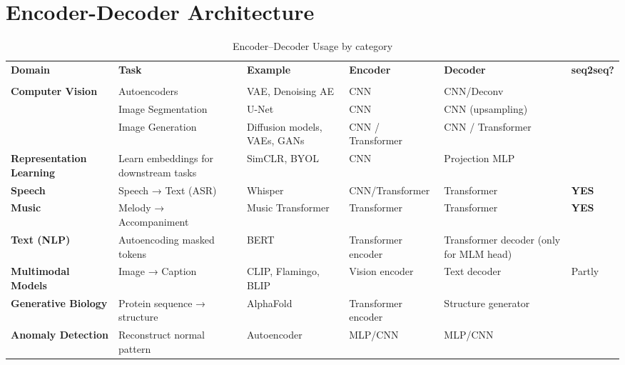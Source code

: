 \chapter{Encoder-Decoder Architecture}

\begin{customArrayStretch}{1.5}
\begin{longtable}{p{2.5cm} p{3cm} p{2.7cm} p{2.7cm} p{2.7cm} l}

\hhline{=:=:=:=:=:=}
\textbf{Domain} & \textbf{Task} & \textbf{Example} & \textbf{Encoder} & \textbf{Decoder} & \textbf{seq2seq?} \\ 
\hhline{=:=:=:=:=:=} \endfirsthead



\hhline{=:=:=:=:=:=} 
\caption{Encoder–Decoder Usage by category \cite{common/online/chatgpt}} \\
\endlastfoot


\textbf{Computer Vision} & Autoencoders & VAE, Denoising AE & CNN & CNN/Deconv &  \\ 
\cline{2-6}

    & Image Segmentation & U-Net & CNN & CNN (upsampling) &  \\ 
\cline{2-6}

    & Image Generation & Diffusion models, VAEs, GANs & CNN / Transformer & CNN / Transformer &  \\ 
\hline

\textbf{Representation Learning} & Learn embeddings for downstream tasks & SimCLR, BYOL & CNN & Projection MLP &  \\
\hline

\textbf{Speech} & Speech → Text (ASR) & Whisper & CNN/Transformer & Transformer & \textbf{YES} \\ 
\hline

\textbf{Music} & Melody → Accompaniment & Music Transformer & Transformer & Transformer & \textbf{YES} \\ 
\hline

\textbf{Text (NLP)} & Autoencoding masked tokens & BERT & Transformer encoder & Transformer decoder (only for MLM head) & \\
\hline

\textbf{Multimodal Models} & Image → Caption & CLIP, Flamingo, BLIP & Vision encoder & Text decoder & Partly \\
\hline

\textbf{Generative Biology} & Protein sequence → structure & AlphaFold & Transformer encoder & Structure generator \\
\hline

\textbf{Anomaly Detection} & Reconstruct normal pattern & Autoencoder & MLP/CNN & MLP/CNN \\
\hline

\end{longtable}
\end{customArrayStretch}










